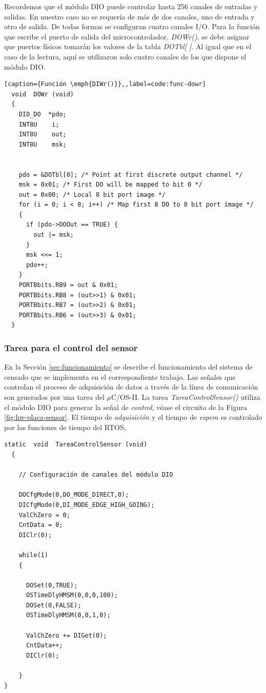 \documentclass[11pt,a4paper,oneside]{article}
\def\uCOS{$\mu$C/OS-II\texttrademark}
\begin{document}
Recordemos que el módulo DIO puede controlar hasta 256 canales de entradas y salidas. En nuestro caso no se requería de más de dos canales, uno de entrada y otro de salida. De todas formas se configuran cuatro canales I/O. Para la función que escribe el puerto de salida del microcontrolador, \emph{DOWr()}, se debe asignar que puertos físicos tomarán los valores de la tabla \emph{DOTbl[ ]}. Al igual que en el caso de la lectura, aquí se utilizaron solo cuatro canales de los que dispone el módulo DIO.

\begin{lstlisting}[caption={Función \emph{DIWr()}},,label=code:func-dowr]
  void  DOWr (void)
  {
    DIO_DO  *pdo;
    INT8U    i;
    INT8U    out;
    INT8U    msk;
    
    
    pdo = &DOTbl[0]; /* Point at first discrete output channel */
    msk = 0x01; /* First DO will be mapped to bit 0 */
    out = 0x00; /* Local 8 bit port image */
    for (i = 0; i < 8; i++) /* Map first 8 DO to 8 bit port image */
    {
      if (pdo->DOOut == TRUE) {
        out |= msk;
      }
      msk <<= 1;
      pdo++;
    }
    PORTBbits.RB9 = out & 0x01;
    PORTBbits.RB8 = (out>>1) & 0x01;
    PORTBbits.RB7 = (out>>2) & 0x01;
    PORTBbits.RB6 = (out>>3) & 0x01;
  }
\end{lstlisting}

\subsubsection{Tarea para el control del sensor}
\label{sec:tarea-sensor}

En la Sección \ref{sec:funcionamiento} se describe el funcionamiento del sistema de censado que se implementa en el correspondiente trabajo. Las señales que controlan el proceso de adquisición de datos a través de la línea de comunicación son generados por una tarea del \uCOS. La tarea \emph{TareaControlSensor()}  utiliza el módulo DIO para generar la señal de \emph{control}, véase el circuito de la Figura \ref{fig:hw-placa-sensor}. El tiempo de \emph{adquisición} y el tiempo de \emph{espera} es controlado por las funciones de tiempo del RTOS, \emph{}

\begin{lstlisting}[caption={Función de la tarea \emph{TareaControlSensor()}},label=code:func-tareacontrol]
  static  void  TareaControlSensor (void)
  {
    
    // Configuración de canales del módulo DIO
    
    DOCfgMode(0,DO_MODE_DIRECT,0);
    DICfgMode(0,DI_MODE_EDGE_HIGH_GOING);
    ValChZero = 0;
    CntData = 0;
    DIClr(0);
    
    while(1)
    {
      
      DOSet(0,TRUE);
      OSTimeDlyHMSM(0,0,0,100);
      DOSet(0,FALSE);
      OSTimeDlyHMSM(0,0,1,0);
      
      ValChZero += DIGet(0);
      CntData++;
      DIClr(0);
      
    }
}
\end{lstlisting}
\end{document}
